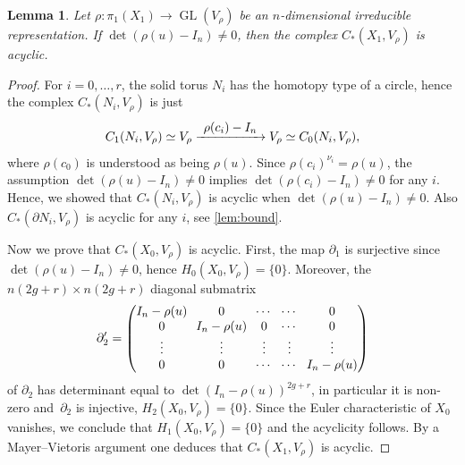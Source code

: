 \documentclass[10pt]{amsart}
\newcommand\To[1]{\mathchoice{\xrightarrow{\textstyle\kern4pt#1\kern3pt}}{\stackrel{#1}{\longrightarrow}}{}{}}
\theoremstyle{plain}
\newtheorem{lem}[thm]{Lemma}
\theoremstyle{definition}
\theoremstyle{remark}
\DeclareMathOperator{\GL}{GL}
\numberwithin{equation}{section}
\begin{document}
\begin{lem}
Let $\rho \colon \pi_1(X_1) \to \GL(V_{\rho})$ be an $n$-dimensional irreducible representation. If $\det (\rho(u)-I_n) \neq 0$, then
the complex $C_*(X_1, V_{\rho})$ is acyclic.
\end{lem}

\begin{proof}
For $i=0, \ldots, r$, the solid torus $N_i$ has the homotopy type of a circle, hence the complex $C_*(N_i, V_{\rho})$ is just
\[
C_1(N_i, V_{\rho}) \simeq V_{\rho} \To{\rho(c_i)-I_n} V_{\rho} \simeq C_0(N_i, V_{\rho}),
\]
where $\rho(c_0)$ is understood as being $\rho(u)$. Since $\rho(c_i)^{\nu_i} = \rho(u)$, the assumption $\det (\rho(u)-I_n) \neq 0$ implies $\det (\rho(c_i)-I_n) \neq 0$ for any $i$.
Hence, we showed that $C_*(N_i, V_{\rho})$ is acyclic when $\det (\rho(u)-I_n) \neq 0$. Also $C_*(\partial N_i, V_\rho)$ is acyclic for any $i$, see \cref{lem:bound}.

Now we prove that $C_*(X_0, V_{\rho})$ is acyclic. First, the map $\partial_1$ is surjective since $\det (\rho(u)-I_n) \neq 0$, hence $H_0(X_0, V_\rho) = \{0\}$. Moreover, the $n(2g+r) \times n(2g+r)$ diagonal submatrix
\[\arraycolsep3.5pt
\partial'_2 = \begin{pmatrix}
I_n - \rho(u) & 0 & \cdots & \cdots & 0\\
0 & I_n - \rho(u) &0 & \cdots & 0\\
\vdots & \vdots & \vdots & \vdots & \vdots\\
0 & 0 & \cdots & \cdots & I_n - \rho(u)\\
\end{pmatrix}
\]
of $\partial_2$ has determinant equal to $\det(I_n - \rho(u))^{2g+r}$, in particular it is non-zero and~$\partial_2$ is injective, \ie $H_2(X_0, V_\rho)=\{0\}$. Since the Euler characteristic of $X_0$ vanishes, we conclude that $H_1(X_0, V_\rho) = \{0\}$ and the acyclicity follows. By a Mayer--Vietoris argument one deduces that $C_*(X_1, V_\rho)$ is acyclic.
\end{proof}
\end{document}
